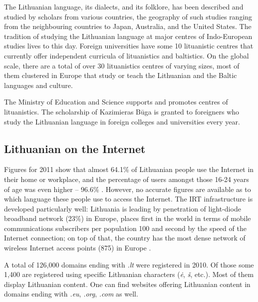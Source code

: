 \begin{multicols}{2}

The Lithuanian language, its dialects, and its folklore, has been described and studied by scholars from various countries, the geography of such studies ranging from the neighbouring countries to Japan, Australia, and the United States. The tradition of studying the Lithuanian language at major centres of Indo-European studies lives to this day. Foreign universities have some 10 lituanistic centres that currently offer independent curricula of lituanistics and baltistics. On the global scale, there are a total of over 30 lituanistics centres of varying sizes, most of them clustered in Europe that study or teach the Lithuanian and the Baltic languages and culture.

The Ministry of Education and Science supports and promotes centres of lituanistics. The scholarship of Kazimieras Būga is granted to foreigners who study the Lithuanian language in foreign colleges and universities every year.

\subsection{Lithuanian on the Internet}

 Figures for 2011 show that almost 64.1\% of Lithuanian people use the Internet in their home or workplace, and the percentage of users amongst those 16-24 years of age was even higher – 96.6\% \cite{stat}.  However, no accurate figures are available as to which language these people use to access the Internet. The IRT infrastructure is developed particularly well: Lithuania is leading by penetration of light-diode broadband network (23\%) in Europe, places first in the world in terms of mobile communications subscribers per population 100 and second by the speed of the Internet connection; on top of that, the country has the most dense network of wireless Internet access points (875) in Europe \cite{invest}.


A total of 126,000 domains ending with \textit{.lt}  were registered in 2010. Of those some 1,400 are registered using specific Lithuanian characters (\textit{ė}, \textit{š}, etc.). Most of them display Lithuanian content. One can find websites offering Lithuanian content in domains ending with \textit{.eu}, \textit{.org}, \textit{.com} as well.


\end{multicols}
